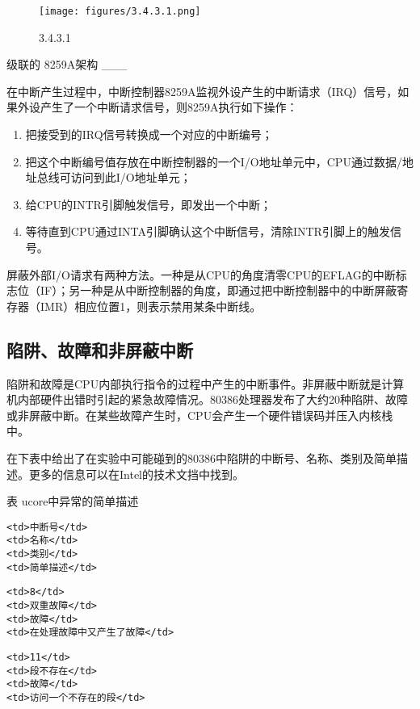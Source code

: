 \begin{figure}[htbp]
\centering
\texttt{[image: figures/3.4.3.1.png]}
\caption{3.4.3.1}
\end{figure}

级联的 8259A架构 \_\_\_

在中断产生过程中，中断控制器8259A监视外设产生的中断请求（IRQ）信号，如果外设产生了一个中断请求信号，则8259A执行如下操作：

\begin{enumerate}
\def\labelenumi{\arabic{enumi}.}
\tightlist
\item
  把接受到的IRQ信号转换成一个对应的中断编号；
\item
  把这个中断编号值存放在中断控制器的一个I/O地址单元中，CPU通过数据/地址总线可访问到此I/O地址单元；
\item
  给CPU的INTR引脚触发信号，即发出一个中断；
\item
  等待直到CPU通过INTA引脚确认这个中断信号，清除INTR引脚上的触发信号。
\end{enumerate}

屏蔽外部I/O请求有两种方法。一种是从CPU的角度清零CPU的EFLAG的中断标志位（IF）；另一种是从中断控制器的角度，即通过把中断控制器中的中断屏蔽寄存器（IMR）相应位置1，则表示禁用某条中断线。

\subsection{陷阱、故障和非屏蔽中断}\label{ux9677ux9631ux6545ux969cux548cux975eux5c4fux853dux4e2dux65ad}

陷阱和故障是CPU内部执行指令的过程中产生的中断事件。非屏蔽中断就是计算机内部硬件出错时引起的紧急故障情况。80386处理器发布了大约20种陷阱、故障或非屏蔽中断。在某些故障产生时，CPU会产生一个硬件错误码并压入内核栈中。

在下表中给出了在实验中可能碰到的80386中陷阱的中断号、名称、类别及简单描述。更多的信息可以在Intel的技术文挡中找到。

表 ucore中异常的简单描述

\begin{lstlisting}
<td>中断号</td>
<td>名称</td>
<td>类别</td>
<td>简单描述</td>
\end{lstlisting}

\begin{lstlisting}
<td>8</td>
<td>双重故障</td>
<td>故障</td>
<td>在处理故障中又产生了故障</td>
\end{lstlisting}

\begin{lstlisting}
<td>11</td>
<td>段不存在</td>
<td>故障</td>
<td>访问一个不存在的段</td>
\end{lstlisting}

